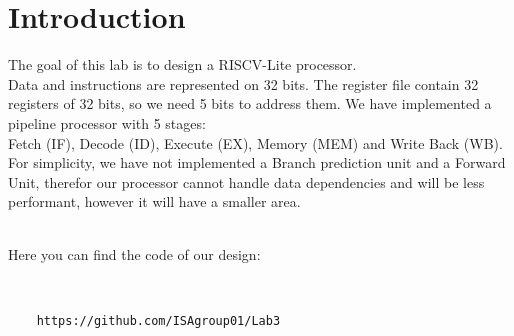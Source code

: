 \chapter{Introduction}

The goal of this lab is to design a RISCV-Lite processor.\\
Data and instructions are represented on 32 bits. The register file contain 32 registers
of 32 bits, so we need 5 bits to address them.
We have implemented a pipeline processor with 5 stages:\\
Fetch (IF), Decode (ID), Execute (EX), Memory (MEM) and Write Back (WB). \\
For simplicity, we have not implemented a Branch prediction unit and a Forward Unit, therefor our processor cannot handle data dependencies and will be less performant, however it will have a smaller area.\\
\vspace{1cm}
\\
\centerline{Here you can find the code of our design:}\\
\begin{verbatim}
	https://github.com/ISAgroup01/Lab3
\end{verbatim}
